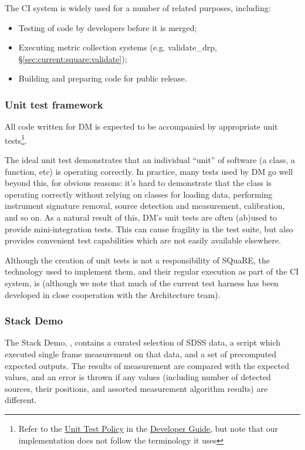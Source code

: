 \documentclass[DM,authoryear,toc,lsstdraft]{lsstdoc}
\begin{document}
The CI system is widely used for a number of related purposes, including:

\begin{itemize}

  \item{Testing of code by developers before it is merged;}
  \item{Executing metric collection systems (e.g. validate\_drp,
  \S\ref{sec:current:square:validate});}
  \item{Building and preparing code for public release.}

\end{itemize}

\subsubsection{Unit test framework}

All code written for DM is expected to be accompanied by appropriate unit
tests\footnote{Refer to the
\href{https://developer.lsst.io/coding/unit_test_policy.html}{Unit Test
Policy} in the \href{https://developer.lsst.io}{Developer Guide}, but note
that our implementation does not follow the terminology it uses}.

The ideal unit test demonstrates that an individual ``unit'' of software (a
class, a function, etc) is operating correctly. In practice, many tests used
by DM go well beyond this, for obvious reasons: it's hard to demonstrate that
the  class is operating correctly without relying on
classes for loading data, performing instrument signature removal, source
detection and measurement, calibration, and so on. As a natural result of
this, DM's unit tests are often (ab)used to provide mini-integration tests.
This can cause fragility in the test suite, but also provides convenient
test capabilities which are not easily available elsewhere.

Although the creation of unit tests is not a responsibility of SQuaRE, the
technology used to implement them, and their regular execution as part of the
CI system, is (although we note that much of the current test harness has been
developed in close cooperation with the Architecture team).

\subsubsection{Stack Demo}
\label{sec:current:square:demo}

The Stack Demo, , contains a curated
selection of SDSS data, a script which executed single frame measurement on
that data, and a set of precomputed expected outputs. The results of
measurement are compared with the expected values, and an error is thrown if
any values (including number of detected sources, their positions, and
assorted measurement algorithm results) are different.
\end{document}
